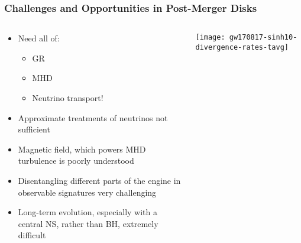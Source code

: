 \documentclass[]{beamer}
\begin{document}
\begin{frame}
{
  }
\end{frame}

\begin{frame}
  \frametitle{Challenges and Opportunities in Post-Merger Disks}
  \begin{columns}
    \begin{column}{6cm}
      \begin{itemize}
      \item Need all of:
        \begin{itemize}
        \item GR
        \item MHD
        \item Neutrino transport!
        \end{itemize}
      \item Approximate treatments of neutrinos not sufficient
      \item Magnetic field, which powers MHD turbulence is poorly understood
      \item Disentangling different parts of the engine in observable
        signatures very challenging
      \item Long-term evolution, especially with a central NS, rather
        than BH, extremely difficult
      \end{itemize}
    \end{column}
    \begin{column}{6cm}
      \begin{center}
        \texttt{[image: gw170817-sinh10-divergence-rates-tavg]}
      \end{center}
    \end{column}
  \end{columns}
\end{frame}
\end{document}
